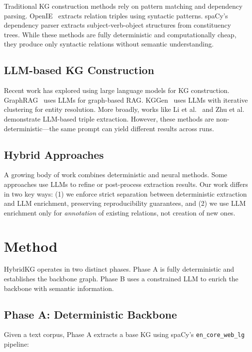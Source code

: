 \documentclass{article}
\newcommand{\method}{HybridKG\xspace}
\begin{document}
Traditional KG construction methods rely on pattern matching and dependency parsing. OpenIE~\cite{angeli2015stanford} extracts relation triples using syntactic patterns. spaCy's dependency parser extracts subject-verb-object structures from constituency trees. While these methods are fully deterministic and computationally cheap, they produce only syntactic relations without semantic understanding.

\subsection{LLM-based KG Construction}

Recent work has explored using large language models for KG construction. GraphRAG~\cite{larson2024} uses LLMs for graph-based RAG. KGGen~\cite{mo2025kggen} uses LLMs with iterative clustering for entity resolution. More broadly, works like Li et al.~\cite{li2023} and Zhu et al.~\cite{zhu2024} demonstrate LLM-based triple extraction. However, these methods are non-deterministic---the same prompt can yield different results across runs.

\subsection{Hybrid Approaches}

A growing body of work combines deterministic and neural methods. Some approaches use LLMs to refine or post-process extraction results. Our work differs in two key ways: (1) we enforce strict separation between deterministic extraction and LLM enrichment, preserving reproducibility guarantees, and (2) we use LLM enrichment only for \emph{annotation} of existing relations, not creation of new ones.

\section{Method}

\method operates in two distinct phases. Phase A is fully deterministic and establishes the backbone graph. Phase B uses a constrained LLM to enrich the backbone with semantic information.

\subsection{Phase A: Deterministic Backbone}

Given a text corpus, Phase A extracts a base KG using spaCy's \texttt{en\_core\_web\_lg} pipeline:
\end{document}
